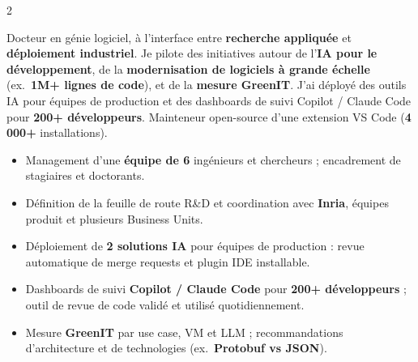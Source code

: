 \documentclass[10pt,a4paper,ragged2e,withhyper]{altacv}
\begin{document}


\makecvheader

\begin{paracol}{2}



Docteur en génie logiciel, à l’interface entre \textbf{recherche appliquée} et \textbf{déploiement industriel}. Je pilote des initiatives autour de l’\textbf{IA pour le développement}, de la \textbf{modernisation de logiciels à grande échelle} (ex.\ \textbf{1M+ lignes de code}), et de la \textbf{mesure GreenIT}. J’ai déployé des outils IA pour équipes de production et des dashboards de suivi Copilot / Claude Code pour \textbf{200+ développeurs}. Mainteneur open-source d’une extension VS Code (\textbf{4\,000+} installations).

\smallskip


\begin{itemize}
  \item Management d’une \textbf{équipe de 6} ingénieurs et chercheurs ; encadrement de stagiaires et doctorants.
  \item Définition de la feuille de route R\&D et coordination avec \textbf{Inria}, équipes produit et plusieurs Business Units.
  \item Déploiement de \textbf{2 solutions IA} pour équipes de production : revue automatique de merge requests et plugin IDE installable.
  \item Dashboards de suivi \textbf{Copilot / Claude Code} pour \textbf{200+ développeurs} ; outil de revue de code validé et utilisé quotidiennement.
  \item Mesure \textbf{GreenIT} par use case, VM et LLM ; recommandations d’architecture et de technologies (ex.\ \textbf{Protobuf vs JSON}).
\end{itemize}


\end{paracol}
\end{document}
